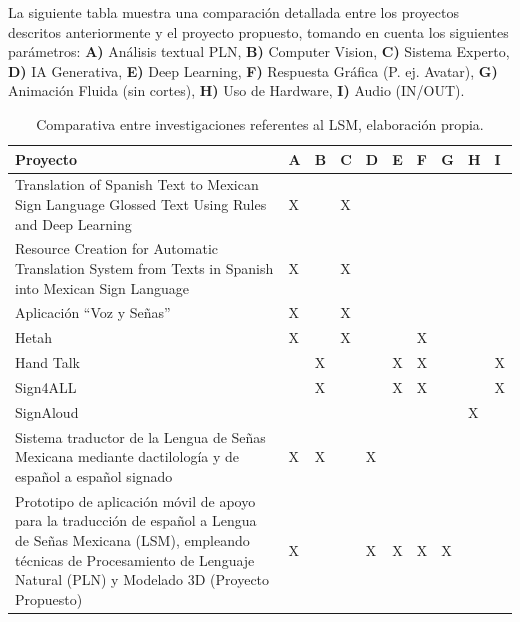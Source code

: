 \newpage
La siguiente tabla muestra una comparación detallada entre los proyectos descritos anteriormente y el proyecto propuesto, tomando en cuenta los siguientes parámetros: \textbf{A)} Análisis textual PLN, \textbf{B)} Computer Vision, \textbf{C)} Sistema Experto, \textbf{D)} IA Generativa, \textbf{E)} Deep Learning, \textbf{F)} Respuesta Gráfica (P. ej. Avatar), \textbf{G)} Animación Fluida (sin cortes), \textbf{H)} Uso de Hardware, \textbf{I)} Audio (IN/OUT).

\begin{table}[H]
    \centering
    \begin{tabular}{|p{6cm}|p{0.5cm}|p{0.5cm}|p{0.5cm}|p{0.5cm}|p{0.5cm}|p{0.5cm}|p{0.5cm}|p{0.5cm}|p{0.5cm}|}
        \hline
        \textbf{Proyecto} & \textbf{A} & \textbf{B} & \textbf{C} & \textbf{D} & \textbf{E} & \textbf{F} & \textbf{G} & \textbf{H} & \textbf{I}\\
        \hline
        Translation of Spanish Text to Mexican Sign Language Glossed Text Using Rules and Deep Learning & X &  & X &  &  &  &  &  &\\
        \hline
        Resource Creation for Automatic Translation System from Texts in Spanish into Mexican Sign Language & X &  & X &  &  &  &  &  &\\
        \hline
        Aplicación “Voz y Señas” & X &  & X &  &  &  &  &  &\\
        \hline
        Hetah & X &  & X &  &  & X &  &  &\\
        \hline
        Hand Talk &  & X &  &  & X & X &  &  & X\\
        \hline
        Sign4ALL &  & X &  &  & X & X &  &  & X\\
        \hline
        SignAloud &  &  &  &  &  &  &  & X & \\
        \hline
        Sistema traductor de la Lengua de Señas Mexicana mediante dactilología y de español a español signado & X & X &  & X &  &  &  &  & \\
        \hline
        Prototipo de aplicación móvil de apoyo para la traducción de español a Lengua de Señas Mexicana (LSM), empleando técnicas de Procesamiento de Lenguaje Natural (PLN) y Modelado 3D (Proyecto Propuesto) & X &  &  & X & X & X & X &  & \\
        \hline
    \end{tabular}
    \caption[Comparativa entre investigaciones referentes al LSM]{Comparativa entre investigaciones referentes al LSM, elaboración propia.}
    \label{tabla:edo_arte}
\end{table}

